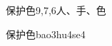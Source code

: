 \begin{entry}{保护色}{9,7,6}{⼈、⼿、⾊}
  \begin{phonetics}{保护色}{bao3hu4se4}
  \end{phonetics}
\end{entry}

